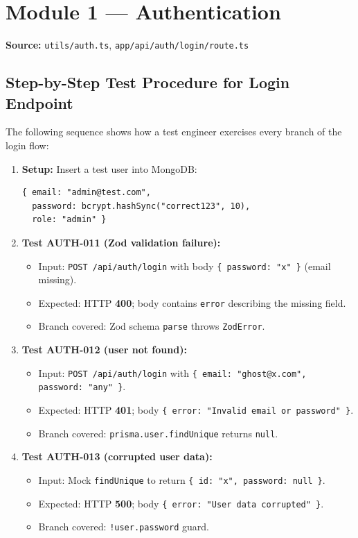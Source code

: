 \documentclass[12pt,a4paper]{report}
\begin{document}
\section{Module 1 --- Authentication}

\textbf{Source:} \texttt{utils/auth.ts}, \texttt{app/api/auth/login/route.ts}

\subsection{Step-by-Step Test Procedure for Login Endpoint}

The following sequence shows how a test engineer exercises every branch of the login flow:

\begin{enumerate}
    \item \textbf{Setup:} Insert a test user into MongoDB:
    \begin{lstlisting}[language={},caption={Test seed data}]
{ email: "admin@test.com",
  password: bcrypt.hashSync("correct123", 10),
  role: "admin" }
    \end{lstlisting}

    \item \textbf{Test AUTH-011 (Zod validation failure):}
    \begin{itemize}
        \item Input: \texttt{POST /api/auth/login} with body \texttt{\{ password: "x" \}} (email missing).
        \item Expected: HTTP \textbf{400}; body contains \texttt{error} describing the missing field.
        \item Branch covered: Zod schema \texttt{parse} throws \texttt{ZodError}.
    \end{itemize}

    \item \textbf{Test AUTH-012 (user not found):}
    \begin{itemize}
        \item Input: \texttt{POST /api/auth/login} with \texttt{\{ email: "ghost@x.com", password: "any" \}}.
        \item Expected: HTTP \textbf{401}; body \texttt{\{ error: "Invalid email or password" \}}.
        \item Branch covered: \texttt{prisma.user.findUnique} returns \texttt{null}.
    \end{itemize}

    \item \textbf{Test AUTH-013 (corrupted user data):}
    \begin{itemize}
        \item Input: Mock \texttt{findUnique} to return \texttt{\{ id: "x", password: null \}}.
        \item Expected: HTTP \textbf{500}; body \texttt{\{ error: "User data corrupted" \}}.
        \item Branch covered: \texttt{!user.password} guard.
    \end{itemize}


\end{enumerate}
\end{document}
